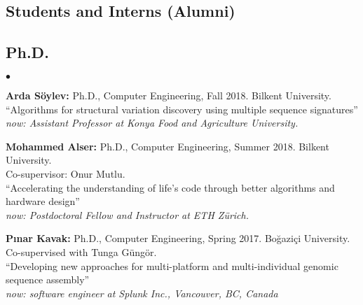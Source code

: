 \documentclass[margin,line]{res}
\newenvironment{list2}{
  \begin{list}{$\bullet$}{%
      \setlength{\itemsep}{0.1cm}
      \setlength{\parsep}{0in} \setlength{\parskip}{0in}
      \setlength{\topsep}{0in} \setlength{\partopsep}{0in} 
      \setlength{\leftmargin}{0.2in}}}{\end{list}}
\begin{document}
\begin{resume}
\section{\sc Students and Interns (Alumni)}
\vspace*{-.4cm}
\subsection{\small \sc Ph.D.}
\begin{list2}
\item
  {\bf Arda Söylev:} Ph.D., Computer Engineering, Fall 2018.
  Bilkent University. \\
  ``Algorithms for structural variation discovery using multiple sequence signatures''\\
    {\it now: Assistant Professor at Konya Food and Agriculture University.}
\item
  {\bf Mohammed Alser:} Ph.D., Computer Engineering, Summer 2018.
  Bilkent University.\\ Co-supervisor: Onur Mutlu.\\
  ``Accelerating the understanding of life’s code through better algorithms and hardware design''\\
  {\it now: Postdoctoral Fellow and Instructor at ETH Zürich.}
\item
  {\bf P{\i}nar Kavak:} Ph.D., Computer Engineering, Spring 2017.
  Bo\u{g}azi\c{c}i University. Co-supervised with Tunga G\"{u}ng\"{o}r.\\
  ``Developing new approaches for multi-platform and multi-individual genomic sequence assembly''\\
  {\it now: software engineer at Splunk Inc., Vancouver, BC, Canada}
\end{list2}

\vspace*{-.4cm}

\end{resume}
\end{document}
